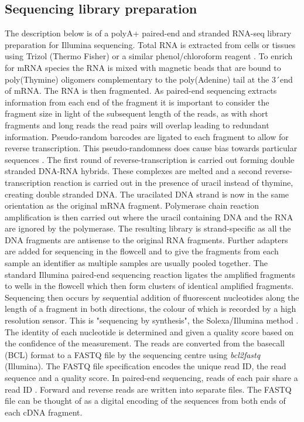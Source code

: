 \subsection{Sequencing library preparation}

The description below is of a polyA+ paired-end and  stranded RNA-seq library preparation for Illumina sequencing.
Total RNA is extracted from cells or tissues using Trizol (Thermo Fisher) or a similar phenol/chloroform reagent \citep{Chomczynski1987}. 
To enrich for mRNA species the RNA is mixed with magnetic beads that are bound to poly(Thymine) oligomers complementary to the poly(Adenine) tail at the 3\'\ end of mRNA. 
The RNA is then fragmented. 
As paired-end sequencing extracts information from each end of the fragment it is important to consider the fragment size in light of the subsequent length of the reads, as with short fragments and long reads the read pairs will overlap leading to redundant information. 
Pseudo-random barcodes are ligated to each fragment to allow for reverse transcription. 
This pseudo-randomness does cause bias towards particular sequences \citep{VanGurp2013}.
The first round of reverse-transcription is carried out forming double stranded DNA-RNA hybrids. 
These complexes are melted and a second reverse-transcription reaction is carried out in the presence of uracil instead of thymine, creating double stranded DNA. The uracilated DNA strand is now in the same orientation as the original mRNA fragment. 
Polymerase chain reaction amplification is then carried out where the uracil containing DNA and the RNA are ignored by the polymerase. 
The resulting library is strand-specific as all the DNA fragments are antisense to the original RNA fragments. Further adapters are added for sequencing in the flowcell and to give the fragments from each sample an identifier as multiple samples are usually pooled together. 
The standard Illumina paired-end sequencing reaction ligates the amplified fragments to wells in the flowcell which then form clusters of identical amplified fragments. 
Sequencing then occurs by sequential addition of fluorescent nucleotides along the length of a fragment in both directions, the  colour of which is recorded by a high resolution sensor. 
This is "sequencing by synthesis", the Solexa/Illumina method \citep{Bentley2008}.
The identity of each nucleotide is determined and given a quality score based on the confidence of the measurement. 
The reads are converted from the basecall (BCL) format to a FASTQ file by the sequencing centre using \textit{bcl2fastq} (Illumina).
The FASTQ file specification \citep{Cock2009} encodes the unique read ID, the read sequence and a quality score. In paired-end sequencing, reads of each pair share a read ID . 
Forward and reverse reads are written into separate files.  
The FASTQ file can be thought of as a digital encoding of the sequences from both ends of each cDNA fragment.

